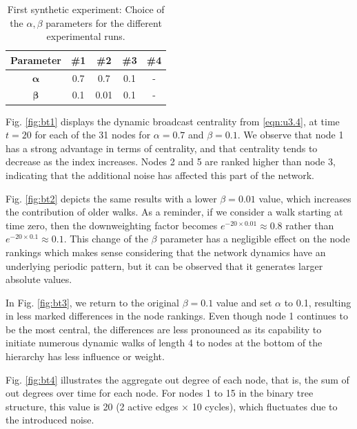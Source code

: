 \begin{table}[ht]
            \bigskip
		\centering %
		\begin{tabular}{c c c c c} %
			\hline\hline %
			\textbf{Parameter} & \textbf{\#1} & \textbf{\#2} & \textbf{\#3} & \textbf{\#4} \\ [0.1ex] %
			\hline\hline 
			$\mathbf{\alpha}$ & 0.7 & 0.7 & 0.1 & -\\ %
			$\mathbf{\beta}$ & 0.1 & 0.01 & 0.1 & - \\ [0.5ex] %
			\hline %
		\end{tabular}
		\caption{First synthetic experiment: Choice of the $\alpha,\beta$ parameters for the different experimental runs.} 
       \label{table:parameters} 
\end{table}

Fig. \ref{fig:bt1} displays the dynamic broadcast centrality from \eqref{eqn:u3.4}, at time $t=20$ for each of the 31 nodes for  $\alpha=0.7$ and $\beta=0.1$. We observe that node 1 has a strong advantage in terms of centrality, and that centrality tends to decrease as the index increases. Nodes 2 and 5 are ranked higher than node 3, indicating that the additional noise has affected this part of the network.

Fig. \ref{fig:bt2} depicts the same results with a lower $\beta=0.01$ value, which increases the contribution of older walks. As a reminder, if we consider a walk starting at time zero, then the  downweighting factor becomes $e^{−20 \times 0.01} \approx 0.8$ rather than $e^{−20 \times 0.1} \approx 0.1$. This change of the $\beta$ parameter has a negligible effect on the node rankings which makes sense considering that the network dynamics have an underlying periodic pattern, but it can be observed that it generates larger absolute values.

In Fig. \ref{fig:bt3}, we return to the original $\beta=0.1$ value and set $\alpha$ to 0.1, resulting in less marked differences in the node rankings. Even though node 1 continues to be the most central, the differences are less pronounced as its capability to initiate numerous dynamic walks of length 4 to nodes at the bottom of the hierarchy has less influence or weight.

Fig. \ref{fig:bt4} illustrates the aggregate out degree of each node, that is, the sum of out degrees over time for each node. For nodes 1 to 15 in the binary tree structure, this value is 20 (2 active edges $\times$ 10 cycles), which fluctuates due to the introduced noise. 

